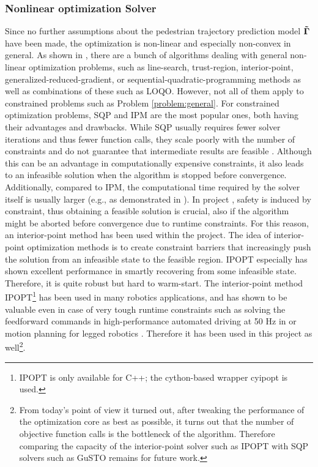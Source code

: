\subsubsection{Nonlinear optimization Solver} 
Since no further assumptions about the pedestrian trajectory prediction model $\distmodel[]$ have been made, the optimization is non-linear and especially non-convex in general. As shown in \cite{Gould2003}\cite{Parkinson2018}\cite{Freund2004}, there are a bunch of algorithms dealing with general non-linear optimization problems, such as line-search, trust-region, interior-point, generalized-reduced-gradient, or sequential-quadratic-programming methods as well as combinations of these such as LOQO. However, not all of them apply to constrained problems such as Problem \ref{problem:general}. For constrained optimization problems, \ac{SQP} and \ac{IPM} are the most popular ones, both having their advantages and drawbacks. While \ac{SQP} usually requires fewer solver iterations and thus fewer function calls, they scale poorly with the number of constraints and do not guarantee that intermediate results are feasible \cite{Dehdari2013}\cite{Parkinson2018}. Although this can be an advantage in computationally expensive constraints, it also leads to an infeasible solution when the algorithm is stopped before convergence. Additionally, compared to \ac{IPM}, the computational time required by the solver itself is usually larger (e.g., as demonstrated in \cite{Dehdari2013}).
\newline
In project \project, safety is induced by constraint, thus obtaining a feasible solution is crucial, also if the algorithm might be aborted before convergence due to runtime constraints. For this reason, an interior-point method has been used within the project. The idea of interior-point optimization methods is to create constraint barriers that increasingly push the solution from an infeasible state to the feasible region. IPOPT especially has shown excellent performance in smartly recovering from some infeasible state.  Therefore, it is quite robust but hard to warm-start. 
\newline
The interior-point method \ac{IPOPT}\footnote{\ac{IPOPT} is only available for C++; the cython-based wrapper cyipopt is used.} \cite{Wachter2006} has been used in many robotics applications, and has shown to be valuable even in case of very tough runtime constraints such as solving the feedforward commands in high-performance automated driving at 50 Hz in \cite{Spielberge2019} or motion planning for legged robotics \cite{Winkler2018}. Therefore it has been used in this project as well\footnote{From today's point of view it turned out, after tweaking the performance of the optimization core as best as possible, it turns out that the number of objective function calls is the bottleneck of the algorithm. Therefore comparing the capacity of the interior-point solver such as \ac{IPOPT} with \ac{SQP} solvers such as \ac{GuSTO} remains for future work.}.

